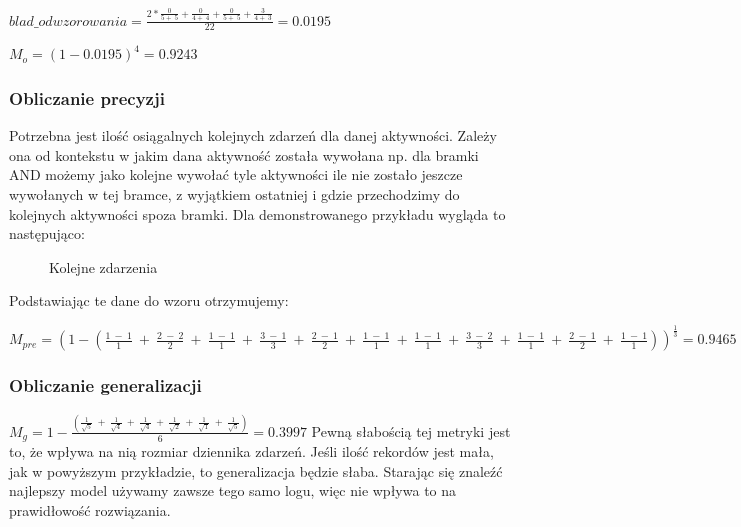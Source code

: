 $blad\_odwzorowania = \frac{2 * \frac{0}{5 +\ 5} + \frac{0}{4 +\ 4} + \frac{0}{5 +\ 5} + \frac{3}{4 +\ 3}}{22} = 0.0195$

$M_o = (1 - 0.0195)^4 = 0.9243$

\subsubsection{Obliczanie precyzji}
Potrzebna jest ilość osiągalnych kolejnych zdarzeń dla danej aktywności. Zależy ona od kontekstu w jakim dana aktywność została wywołana np. dla bramki AND możemy jako kolejne wywołać tyle aktywności ile nie zostało jeszcze wywołanych w tej bramce, z wyjątkiem ostatniej i gdzie przechodzimy do kolejnych aktywności spoza bramki. Dla demonstrowanego przykładu wygląda to następująco:

\begin{figure}[h]
	\caption{\label{fig:directly-follows}Kolejne zdarzenia}
\end{figure}

Podstawiając te dane do wzoru otrzymujemy:\newline

$M_{pre} = (1 - (\frac{1\ -\ 1}{1}\ +\ \frac{2\ -\ 2}{2}\ +\ \frac{1\ -\ 1}{1}\ +\ \frac{3\ -\ 1}{3}\ +\ \frac{2\ -\ 1}{2}\ +\ \frac{1\ -\ 1}{1}\ +\ \frac{1\ -\ 1}{1}\ +\ \frac{3\ -\ 2}{3}\ +\ \frac{1\ -\ 1}{1}\ +\ \frac{2\ -\ 1}{2}\ +\ \frac{1\ -\ 1}{1}))^{\frac{1}{3}} = 0.9465 $

\subsubsection{Obliczanie generalizacji}
$M_g = 1 - \frac{(\frac{1}{\sqrt{5}}\ +\ \frac{1}{\sqrt{4}}\ +\ \frac{1}{\sqrt{4}}\ +\ \frac{1}{\sqrt{2}}\ +\ \frac{1}{\sqrt{1}}\ +\ \frac{1}{\sqrt{5}})}{6} = 0.3997$
\newline Pewną słabością tej metryki jest to, że wpływa na nią rozmiar dziennika zdarzeń. Jeśli ilość rekordów jest mała, jak w powyższym przykładzie, to generalizacja będzie słaba. Starając się znaleźć najlepszy model używamy zawsze tego samo logu, więc nie wpływa to na prawidłowość rozwiązania.

